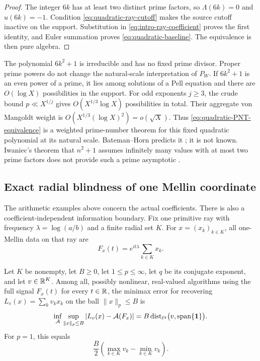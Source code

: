 \begin{proof}
The integer $6k$ has at least two distinct prime factors, so
$\Lambda(6k)=0$ and $u(6k)=-1$.  Condition
\eqref{eq:quadratic-ray-cutoff} makes the source cutoff inactive on the
support.  Substitution in \eqref{eq:intro-ray-coefficient} proves the
first identity, and Euler summation proves
\eqref{eq:quadratic-baseline}.  The equivalence is then pure algebra.
\end{proof}

The polynomial $6k^2+1$ is irreducible and has no fixed prime divisor.
Proper prime powers do not change the natural-scale interpretation of
$P_W$.  If $6k^2+1$ is an even power of a prime, it lies among solutions
of a Pell equation and there are $O(\log X)$ possibilities in the
support.  For odd exponents $j\geq3$, the crude bound
$p\ll X^{1/j}$ gives $O(X^{1/3}\log X)$ possibilities in total.  Their
aggregate von Mangoldt weight is
$O(X^{1/3}(\log X)^2)=o(\sqrt X)$.  Thus
\eqref{eq:quadratic-PNT-equivalence} is a weighted prime-number theorem
for this fixed quadratic polynomial at its natural scale.  Bateman--Horn
predicts it \citep{BatemanHorn1962}; it is not known.  Iwaniec's theorem
that $n^2+1$ assumes infinitely many values with at most two prime factors
does not provide such a prime asymptotic \citep{Iwaniec1978}.

\subsection{Exact radial blindness of one Mellin coordinate}

The arithmetic examples above concern the actual coefficients.  There is
also a coefficient-independent information boundary.  Fix one primitive
ray with frequency $\lambda=\log(a/b)$ and a finite radial set $K$.  For
$x=(x_k)_{k\in K}$, all one-Mellin data on that ray are
\begin{equation}
 F_x(t)=e^{it\lambda}\sum_{k\in K}x_k.
 \label{eq:one-ray-signal}
\end{equation}

\begin{proposition}
\label{prop:radial-blindness}
Let $K$ be nonempty, let $B\geq0$, let $1\leq p\leq\infty$, let $q$ be
its conjugate exponent, and let $v\in\mathbb R^K$.  Among all, possibly
nonlinear, real-valued algorithms using the full
signal $F_x(t)$ for every $t\in\mathbb R$, the minimax error for recovering
$L_v(x)=\sum_kv_kx_k$ on the ball $\|x\|_p\leq B$ is
\begin{equation}
 \inf_{\mathcal A}
 \sup_{\|x\|_p\leq B}
 |L_v(x)-\mathcal A(F_x)|
 =B\operatorname{dist}_{\ell^q}\bigl(v,\operatorname{span}\{\mathbf 1\}\bigr).
 \label{eq:radial-minimax}
\end{equation}
For $p=1$, this equals
\begin{equation}
 \frac B2\left(\max_{k\in K}v_k-\min_{k\in K}v_k\right).
 \label{eq:l1-radial-minimax}
\end{equation}
\end{proposition}

